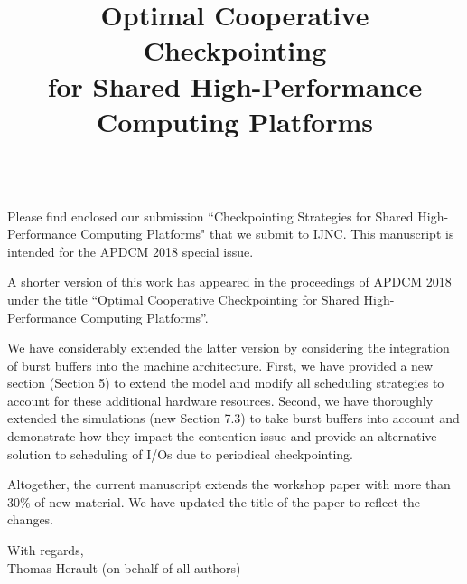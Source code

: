 \documentclass[a4paper, 10pt, singlespacing]{article}
\title{Optimal Cooperative Checkpointing\\ 
for
Shared High-Performance Computing Platforms}
\date{}
\begin{document}
\thispagestyle{empty}
\maketitle
\thispagestyle{empty}

\\

\noindent
Please find enclosed our submission ``Checkpointing Strategies for
Shared High-Performance Computing Platforms" that we submit to IJNC.
This manuscript is intended for the APDCM 2018 special issue.

\bigskip
\noindent
A shorter version of this work has appeared in the proceedings of
APDCM 2018 under the title ``Optimal Cooperative Checkpointing for
Shared High-Performance Computing Platforms''.  

\bigskip
\noindent
We have considerably extended the
latter version by considering the integration of burst buffers into
the machine architecture. 
First, we have provided a new section (Section 5) to extend the model
and modify all scheduling strategies to account for these additional hardware resources.
Second, we have thoroughly extended the simulations (new Section 7.3) to take burst buffers
into account and demonstrate how they impact the contention
issue and provide an alternative solution to scheduling of I/Os due
to periodical checkpointing.

\bigskip
\noindent
Altogether, the current manuscript extends the workshop paper with more than $30\%$ of new material.
We have updated the title of the paper to reflect the changes.

\bigskip
\noindent
With regards,\\
Thomas Herault (on behalf of all authors)
\end{document}
